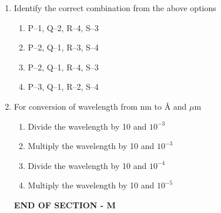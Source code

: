\documentclass[journal,12pt,onecolumn]{IEEEtran}
\begin{document}
\begin{enumerate}
\item Identify the correct combination from the above options  
\begin{multicols}{2}
\begin{enumerate}[label=(\Alph*)]
    \item P--1, Q--2, R--4, S--3
    \item P--2, Q--1, R--3, S--4
    \item P--2, Q--1, R--4, S--3
    \item P--3, Q--1, R--2, S--4
\end{enumerate}
\end{multicols}

\item For conversion of wavelength from nm to \AA{} and $\mu$m  
\begin{multicols}{2}
\begin{enumerate}[label=(\Alph*)]
    \item Divide the wavelength by 10 and $10^{-3}$
    \item Multiply the wavelength by 10 and $10^{-3}$
    \item Divide the wavelength by 10 and $10^{-4}$
    \item Multiply the wavelength by 10 and $10^{-5}$
\end{enumerate}
\end{multicols}
\begin{center}
\textbf{END OF SECTION - M}
\end{center}
\end{enumerate}
\end{document}
